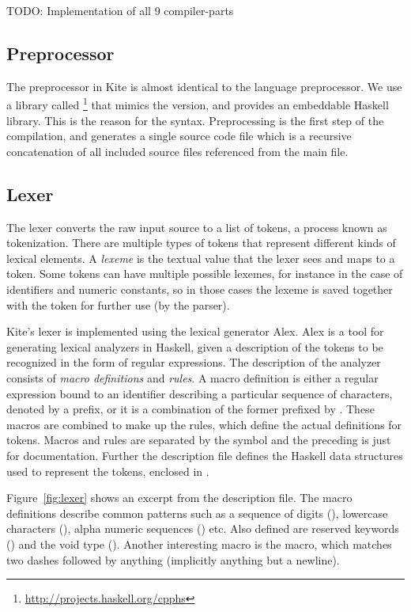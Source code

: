 TODO: Implementation of all 9 compiler-parts


\subsection{Preprocessor}

The preprocessor in Kite is almost identical to the  language preprocessor. We use a library called \footnote{\url{http://projects.haskell.org/cpphs}} that mimics the  version, and provides an embeddable Haskell library. This is the reason for the  syntax. Preprocessing is the first step of the compilation, and generates a single source code file which is a recursive concatenation of all included source files referenced from the main file.

\subsection{Lexer}
The lexer converts the raw input source to a list of tokens, a process known as tokenization. There are multiple types of tokens that represent different kinds of lexical elements. A \emph{lexeme} is the textual value that the lexer sees and maps to a token. Some tokens can have multiple possible lexemes, for instance in the case of identifiers and numeric constants, so in those cases the lexeme is saved together with the token for further use (by the parser).

Kite's lexer is implemented using the lexical generator Alex. Alex is a tool for generating lexical analyzers in Haskell, given a description of the tokens to be recognized in the form of regular expressions\cite[p. 4]{dornan01}. The description of the analyzer consists of \emph{macro definitions} and \emph{rules}. A macro definition is either a regular expression bound to an identifier describing a particular sequence of characters, denoted by a \code{\$} prefix, or it is a combination of the former prefixed by . These macros are combined to make up the rules, which define the actual definitions for tokens. Macros and rules are separated by the symbol \code{:-} and the preceding  is just for documentation\cite[p. 7]{dornan01}. Further the description file defines the Haskell data structures used to represent the tokens, enclosed in \code{\{ \}}.

Figure~\ref{fig:lexer} shows an excerpt from the description file. The macro definitions describe common patterns such as a sequence of digits (), lowercase characters (), alpha numeric sequences () etc. Also defined are reserved keywords (\code{\@keywords}) and the void type (). Another interesting macro is the  macro, which matches two dashes followed by anything (implicitly anything but a newline).

